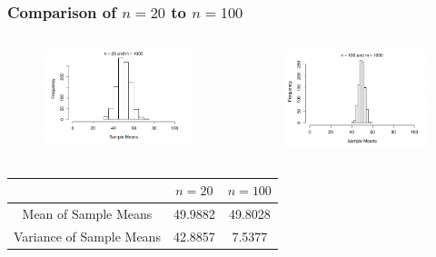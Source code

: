 \documentclass[12pt]{beamer}
\begin{document}
\begin{frame}
	\frametitle{Comparison of $n=20$ to $n=100$}
	\begin{columns}
		\begin{figure}
			\includegraphics[width=5.2cm]{histo5.png}
		\end{figure}


		
		\begin{figure}
			\includegraphics[width=5cm]{histo6.png}
		\end{figure}

	\end{columns}
	\centering
		\begin{tabular}{ccc}
		\toprule
		&$n=20$&$n=100$\\
		\midrule
		Mean of Sample Means& 49.9882&49.8028\\
		Variance of Sample Means&42.8857&7.5377\\
		\bottomrule
	\end{tabular}
\end{frame}
\end{document}
